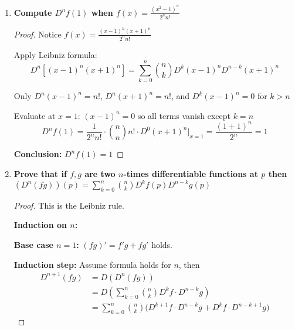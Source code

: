 \documentclass[14pt]{extarticle}
\begin{document}
\begin{enumerate}
\begin{proof}
Compute the derivative at $0$ using the definition
\[
f'(0) = \lim_{x\to 0} \frac{f(x) - f(0)}{x} = \lim_{x\to 0} \frac{\frac{\log(1+x)}{\sin x} - 1}{x}
= \lim_{x\to 0} \frac{\log(1+x) - \sin x}{x \sin x}
\]

Use the Taylor expansions around $x=0$:
\[
\log(1+x) = x - \frac{x^2}{2} + O(x^3), \qquad \sin x = x - \frac{x^3}{6} + O(x^5)
\]

Thus
\[
\log(1+x) - \sin x = -\frac{x^2}{2} + O(x^3), \quad x\sin x = x^2 + O(x^4)
\]

Hence
\[
f'(0) = \lim_{x\to 0} \frac{-\frac{x^2}{2} + O(x^3)}{x^2 + O(x^4)} = -\frac12
\]

\medskip
\textbf{Conclusion:} $f$ is differentiable at $0$ and
\[
\boxed{f'(0) = -\frac12}
\]
\end{proof}

\newpage
\item \textbf{Compute $D^n f(1)$ when $f(x) = \frac{(x^2-1)^n}{2^n n!}$}

\begin{proof}
Notice $f(x) = \frac{(x-1)^n (x+1)^n}{2^n n!}$

Apply Leibniz formula:
\[
D^n[(x-1)^n (x+1)^n] = \sum_{k=0}^n \binom{n}{k} D^k (x-1)^n D^{n-k} (x+1)^n
\]

Only $D^n (x-1)^n = n!$, $D^n (x+1)^n = n!$, and $D^k (x-1)^n = 0$ for $k>n$

Evaluate at $x=1$: $(x-1)^n = 0$ so all terms vanish except $k=n$
\[
D^n f(1) = \frac{1}{2^n n!} \cdot \binom{n}{n} n! \cdot D^0 (x+1)^n|_{x=1} = \frac{(1+1)^n}{2^n} = 1
\]

\medskip
\textbf{Conclusion:} $D^n f(1) = 1$
\end{proof}

\newpage
\item \textbf{Prove that if $f,g$ are two $n$-times differentiable functions at $p$ then $(D^n (fg))(p) = \sum_{k=0}^n \binom{n}{k} D^k f(p) D^{n-k} g(p)$}

\begin{proof}
This is the Leibniz rule. 

\medskip
\textbf{Induction on $n$:}

\textbf{Base case $n=1$:} $(fg)' = f'g + fg'$ holds.

\textbf{Induction step:} Assume formula holds for $n$, then
\begin{align*}
D^{n+1} (fg) &= D(D^n(fg)) \\ &= D\left( \sum_{k=0}^n \binom{n}{k} D^k f \cdot D^{n-k} g \right) \\ &= \sum_{k=0}^n \binom{n}{k} \bigl( D^{k+1} f \cdot D^{n-k} g + D^k f \cdot D^{n-k+1} g \bigr)
\end{align*}


\end{proof}
\end{enumerate}
\end{document}
